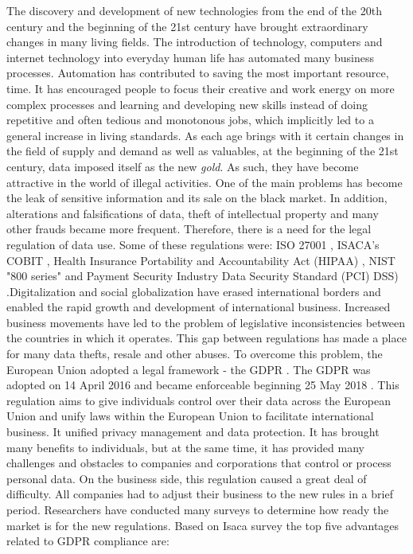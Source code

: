 \documentclass[11pt,english]{article}
\begin{document}
\quad The discovery and development of new technologies from the end of the 20th century and the beginning of the 21st century have brought extraordinary changes in many living fields. The introduction of technology, computers and internet technology into everyday human life has automated many business processes. Automation has contributed to saving the most important resource, time. It has encouraged people to focus their creative and work energy on more complex processes and learning and developing new skills instead of doing repetitive and often tedious and monotonous jobs, which implicitly led to a general increase in living standards. \newline As each age brings with it certain changes in the field of supply and demand as well as valuables, at the beginning of the 21st century, data imposed itself as the new \emph{gold}. As such, they have become attractive in the world of illegal activities. One of the main problems has become the leak of sensitive information and its sale on the black market. In addition, alterations and falsifications of data, theft of intellectual property and many other frauds became more frequent. Therefore, there is a need for the legal regulation of data use. Some of these regulations were: ISO 27001 \cite{iso}, ISACA's COBIT \cite{cobit}, Health Insurance Portability and Accountability Act (HIPAA) \cite{hipaa}, NIST "800 series" \cite{nist} and Payment Security Industry Data Security Standard (PCI) DSS) \cite{pci}.\newline Digitalization and social globalization have erased international borders and enabled the rapid growth and development of international business. Increased business movements have led to the problem of legislative inconsistencies between the countries in which it operates. This gap between regulations has made a place for many data thefts, resale and other abuses. To overcome this problem, the European Union adopted a legal framework - the GDPR \cite{gdprRegulation}. The GDPR was adopted on 14 April 2016 and became enforceable beginning 25 May 2018 \cite{gdpr}. This regulation aims to give individuals control over their data across the European Union and unify laws within the European Union to facilitate international business. It unified privacy management and data protection. It has brought many benefits to individuals, but at the same time, it has provided many challenges and obstacles to companies and corporations that control or process personal data. On the business side, this regulation caused a great deal of difficulty. All companies had to adjust their business to the new rules in a brief period. \newline \quad Researchers have conducted many surveys to determine how ready the market is for the new regulations. Based on Isaca survey \cite{isaca} the top five advantages related to GDPR compliance are:
\end{document}
